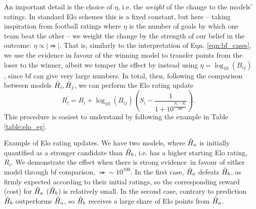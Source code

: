 {An important detail is the choice of $\eta$, i.e. the \emph{weight} of the 
    change to the models' ratings. 
In standard Elo schemes this is a fixed constant, 
    but here -- taking inspiration from football ratings where $\eta$ is the number of goals 
    by which one team beat the other -- we weight the change by the strength of our belief in the outcome: 
    $\eta \propto \lvert \bij \rvert$.
That is, similarly to the interpretation of Eqn. \ref{eqn:bf_cases}, 
    we use the evidence in favour of the winning model to transfer points from the loser to the winner,
    albeit we temper the effect by instead using $\eta = \log_{10}(B_{ij})$, since \gls{bf} can give very large numbers. 
In total, then, following the comparison between models $\hat{H}_i, \hat{H}_j$, we can perform the \gls{Elo rating} update
\begin{equation}
    \label{eqn:elo_update}
    R_i^{\prime} = R_i + \log_{10}(B_{ij}) \left(S_i - \frac{1}{1 + 10^{\frac{R_j - R_i}{400}}}\right).
\end{equation}
This procedure is easiest to understand by following the example in Table \ref{table:elo_eg}. 

\begin{table}
    \centering
    
    \caption[Example of Elo rating updates]{
        Example of \gls{Elo rating} updates. 
        We have two models, where $\hat{H}_a$ is initially quantified as a stronger candidate than $\hat{H}_b$, 
            i.e. has a higher starting \gls{Elo rating}, $R_i$.     
        We demonstrate the effect when there is strong evidence\footnotemark \ in favour of either model through \gls{bf} comparison, $\bij \sim 10^{100}$. 
        In the first case, $\hat{H}_a$ defeats $\hat{H}_b$, as firmly expected according to their initial ratings,
            so the corresponding reward (cost) for $\hat{H}_a$ ($\hat{H}_b$) is relatively small.
        In the second case, contrary to prediction $\hat{H}_b$ outperforms $\hat{H}_a$, 
            so $\hat{H}_b$ receives a large share of Elo points from $\hat{H}_a$. 
    }
    \label{table:elo_eg}
\end{table}


}
